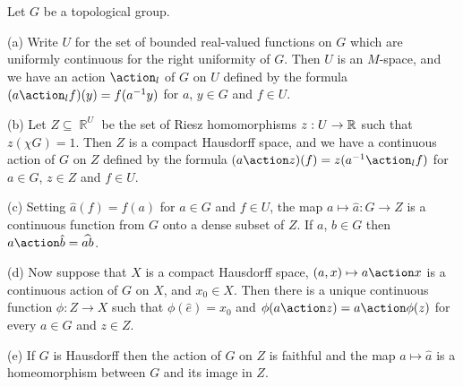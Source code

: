  Let $G$ be a topological group.

(a) Write $U$ for the set of bounded real-valued functions on
$G$ which are uniformly continuous for the right uniformity of $G$.
Then $U$ is an $M$-space, and we have an action $\action_l$ of $G$ on
$U$ defined by
the formula $(a\action_lf)(y)=f(a^{-1}y)$ for $a$, $y\in G$ and
$f\in U$.

(b) Let $Z\subseteq\BbbR^U$ be the set of Riesz homomorphisms
$z:U\to\Bbb R$ such that $z(\chi G)=1$.   Then $Z$ is a compact
Hausdorff space, and we have a continuous action of $G$ on $Z$ defined
by the formula $(a\action z)(f)=z(a^{-1}\action_lf)$ for
$a\in G$, $z\in Z$ and $f\in U$.

(c) Setting $\hat a(f)=f(a)$ for $a\in G$ and $f\in U$, the map
$a\mapsto\hat a:G\to Z$ is a continuous function from $G$ onto a dense
subset of $Z$.   If $a$, $b\in G$ then
$a\action\hat b=\widehat{ab}$.

(d) Now suppose that $X$ is a compact Hausdorff space,
$(a,x)\mapsto a\action x$ is a continuous action of $G$ on $X$, and
$x_0\in X$.    Then there is a unique
continuous function $\phi:Z\to X$ such
that $\phi(\hat e)=x_0$ and $\phi(a\action z)=a\action\phi(z)$ for
every $a\in G$ and $z\in Z$.

(e) If $G$ is Hausdorff then the action of $G$ on $Z$ is faithful and
the map $a\mapsto\hat a$ is a homeomorphism between $G$ and its image
in
$Z$.

